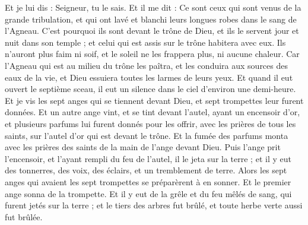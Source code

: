 \begin{multicols}{2}
Et je lui dis : Seigneur, tu le sais. Et il me dit : Ce sont ceux qui sont venus de la grande tribulation, et qui ont lavé et blanchi leurs longues robes dans le sang de l'Agneau.
C'est pourquoi ils sont devant le trône de Dieu, et ils le servent jour et nuit dans son temple ; et celui qui est assis sur le trône habitera avec eux.
Ils n'auront plus faim ni soif, et le soleil ne les frappera plus, ni aucune chaleur.
Car l'Agneau qui est au milieu du trône les paîtra, et les conduira aux sources des eaux de la vie, et Dieu essuiera toutes les larmes de leurs yeux.
\VerseOne{}Et quand il eut ouvert le septième sceau, il eut un silence dans le ciel d'environ une demi-heure.
Et je vis les sept anges qui se tiennent devant Dieu, et sept trompettes leur furent données.
Et un autre ange vint, et se tint devant l'autel, ayant un encensoir d'or, et plusieurs parfums lui furent donnés pour les offrir, avec les prières de tous les saints, sur l'autel d'or qui est devant le trône.
Et la fumée des parfums monta avec les prières des saints de la main de l'ange devant Dieu.
Puis l'ange prit l'encensoir, et l'ayant rempli du feu de l'autel, il le jeta sur la terre ; et il y eut des tonnerres, des voix, des éclairs, et un tremblement de terre.
Alors les sept anges qui avaient les sept trompettes se préparèrent à en sonner.
Et le premier ange sonna de la trompette. Et il y eut de la grêle et du feu mêlés de sang, qui furent jetés sur la terre ; et le tiers des arbres fut brûlé, et toute herbe verte aussi fut brûlée.

\end{multicols}
